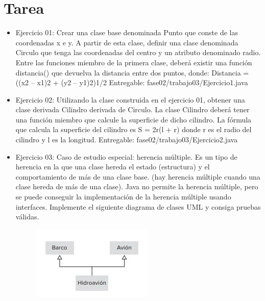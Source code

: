 \documentclass{article}
\begin{document}

\section{Tarea}
	\begin{itemize}		
        \item Ejercicio 01: Crear una clase base denominada Punto que conste de las coordenadas x e y. A partir de esta clase, definir una clase denominada Circulo que tenga las coordenadas del centro y un atributo denominado radio. Entre las funciones miembro de la primera clase, deberá existir una función distancia() que devuelva la distancia entre dos puntos, donde: \newline
        Distancia = ((x2 – x1)2 + (y2 – y1)2)1/2
        Entregable: fase02/trabajo03/Ejercicio1.java
        
        \item Ejercicio 02: Utilizando la clase construida en el ejercicio 01, obtener una clase derivada Cilindro derivada de Circulo. La clase Cilindro deberá tener una función miembro que calcule la superficie de dicho cilindro. La fórmula que calcula la superficie del cilindro es S = 2r(l + r) donde r es el radio del cilindro y l es la longitud.
        Entregable: fase02/trabajo03/Ejercicio2.java

        \item Ejercicio 03: Caso de estudio especial: herencia múltiple. Es un tipo de herencia en la que una clase hereda el estado (estructura) y el comportamiento de más de una clase base. (hay herencia múltiple cuando una clase hereda de más de una clase). Java no permite la herencia múltiple, pero se puede conseguir la implementación de la herencia múltiple usando interfaces. Implemente el siguiente diagrama de clases UML y consiga pruebas válidas.

        \begin{figure}[H]
            \centering
            \includegraphics[width=0.31
            \textwidth,keepaspectratio]{img/Ejercicio3.jpg}
        \end{figure}

	\end{itemize}
\end{document}
